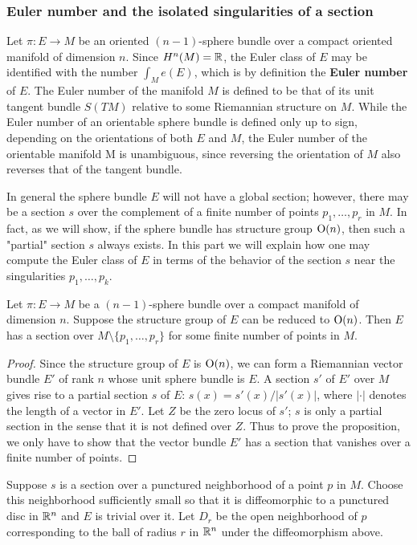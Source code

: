 \subsubsection{Euler number and the isolated singularities of a section}
Let $\pi:E\to M$ be an oriented $(n-1)$-sphere bundle over a compact oriented manifold of dimension $n$. Since $H^n(M)=\mathbb{R}$, the Euler class of $E$ may be identified 
with the number $\int_Me(E)$, which is by definition the \textbf{Euler number} of $E$. The Euler number of the manifold $M$ is defined to be that of its unit tangent 
bundle $S(TM)$ relative to some Riemannian structure on $M$. While the Euler number of an orientable sphere bundle is defined only up to sign, depending on the 
orientations of both $E$ and $M$, the Euler number of the orientable manifold M is unambiguous, since reversing the orientation of $M$ also reverses that of the 
tangent bundle.\par
In general the sphere bundle $E$ will not have a global section; however, there may be a section $s$ over the complement of a finite number of points $p_1,\dots,p_r$ in 
$M$. In fact, as we will show, if the sphere bundle has structure group $\mathrm{O}(n)$, then such a "partial" section $s$ always exists. In this part we will explain how one 
may compute the Euler class of $E$ in terms of the behavior of the section $s$ near the singularities $p_1,\dots,p_k$.
\begin{proposition}
Let $\pi:E\to M$ be a $(n-1)$-sphere bundle over a compact manifold of dimension $n$. Suppose the structure group of $E$ can be reduced to $\mathrm{O}(n)$. Then $E$ has a 
section over $M\setminus\{p_1,\dots,p_r\}$ for some finite number of points in $M$.
\end{proposition}
\begin{proof}
Since the structure group of $E$ is $\mathrm{O}(n)$, we can form a Riemannian vector bundle $E'$ of rank $n$ whose unit sphere bundle is $E$. A section $s'$ of $E'$ over $M$ 
gives rise to a partial section $s$ of $E$: $s(x)=s'(x)/|s'(x)|$, where $|\cdot|$ denotes the length of a vector in $E'$. Let $Z$ be the zero locus of $s'$; $s$ is 
only a partial section in the sense that it is not defined over $Z$. Thus to prove the proposition, we only have to show that the vector bundle $E'$ has a section
that vanishes over a finite number of points.
\end{proof}
Suppose $s$ is a section over a punctured neighborhood of a point $p$ in $M$. Choose this neighborhood sufficiently small so that it is diffeomorphic to a punctured 
disc in $\mathbb{R}^n$ and $E$ is trivial over it. Let $D_r$ be the open neighborhood of $p$ corresponding to the ball of radius $r$ in $\mathbb{R}^n$ under the diffeomorphism above. 

